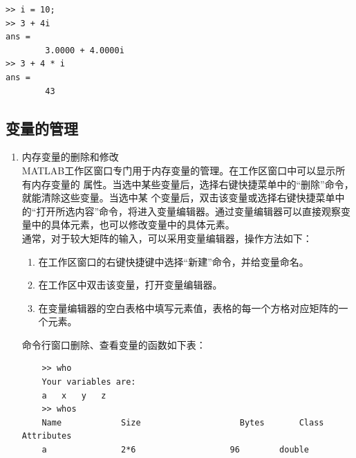 \newpage
{}
\begin{lstlisting}
>> i = 10;
>> 3 + 4i
ans =
		3.0000 + 4.0000i
>> 3 + 4 * i
ans =
		43
\end{lstlisting}

\subsection{变量的管理}
\begin{enumerate}
	\item 内存变量的删除和修改\\
	MATLAB工作区窗口专门用于内存变量的管理。在工作区窗口中可以显示所有内存变量的
	属性。当选中某些变量后，选择右键快捷菜单中的“删除”命令，就能清除这些变量。当选中某
	个变量后，双击该变量或选择右键快捷菜单中的“打开所选内容”命令，将进入变量编辑器。通过变量编辑器可以直接观察变量中的具体元素，也可以修改变量中的具体元素。\\
	通常，对于较大矩阵的输入，可以采用变量编辑器，操作方法如下：
	\begin{enumerate}[(1)]
		\item 在工作区窗口的右键快捷键中选择“新建”命令，并给变量命名。
		\item 在工作区中双击该变量，打开变量编辑器。
		\item 在变量编辑器的空白表格中填写元素值，表格的每一个方格对应矩阵的一个元素。
	\end{enumerate}
	命令行窗口删除、查看变量的函数如下表：
	\begin{table}[!htb]
		\centering
	\end{table}
\vspace*{-1em}
\begin{lstlisting}
	>> who
	Your variables are:
	a	x	y	z
	>> whos
	Name			Size					Bytes		Class			Attributes
	a				2*6					  96		double

\end{lstlisting}
\end{enumerate}
